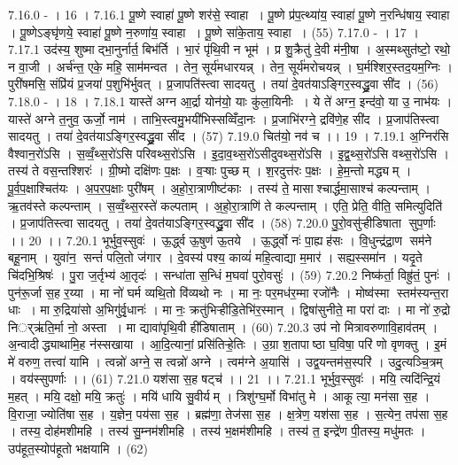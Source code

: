 7.16.0
- । 16 ।
7.16.1
पू॒ष्णे स्वाहा॑ पू॒ष्णे शर॑से॒ स्वाहा । पू॒ष्णे प्र॑प॒त्थ्या॑य॒ स्वाहा॑ पू॒ष्णे न॒रन्धि॑षाय॒ स्वाहा । पू॒ष्णेऽङ्घृ॑णये॒ स्वाहा॑ पू॒ष्णे न॒रुणा॑य॒ स्वाहा । पू॒ष्णे सा॑के॒ताय॒ स्वाहा । (55)
7.17.0
- । 17 ।
7.17.1
उद॑स्य॒ शुष्माद्भा॒नुर्नार्त॒ बिभ॑र्ति । भा॒रं पृ॑थि॒वी न भूम॑ । प्र शु॒क्रैतु॑ दे॒वी म॑नी॒षा । अ॒स्मथ्सुत॑ष्टो॒ रथो॒ न वा॒जी । अर्च॑न्त॒ एके॒ महि॒ साम॑मन्वत । तेन॒ सूर्य॑मधारयन्न् । तेन॒ सूर्य॑मरोचयन्न् । घ॒र्मश्शिर॒स्तद॒यम॒ग्निः । पुरी॑षमसि॒ संप्रि॑यं प्र॒जया॑ प॒शुभि॑र्भुवत् । प्र॒जापति॑स्त्वा सादयतु । तया॑ दे॒वत॑याऽङ्गिर॒स्वद्ध्रु॒वा सी॑द । (56)
7.18.0
- । 18 ।
7.18.1
यास्ते॑ अग्न आ॒र्द्रा योन॑यो॒ याः कु॑ला॒यिनीः । ये ते॑ अग्न॒ इन्द॑वो॒ या उ॒ नाभ॑यः । यास्ते॑ अग्ने त॒नुव॒ ऊर्जो॒ नाम॑ । ताभि॒स्त्वमु॒भयी॑भिस्सव्विँदा॒नः । प्र॒जाभि॑रग्ने॒ द्रवि॑णे॒ह सी॑द । प्र॒जाप॑तिस्त्वा सादयतु । तया॑ दे॒वत॑याऽङ्गिर॒स्वद्ध्रु॒वा सी॑द । (57)
7.19.0
चित॑यो॒ नव॑ च ।। 19 ।
7.19.1
अ॒ग्निर॑सि वैश्वान॒रो॑ऽसि । स॒व्वँ॒थ्स॒रो॑ऽसि परिवथ्स॒रो॑ऽसि । इ॒दा॒व॒थ्स॒रो॑ऽसीदुवथ्स॒रो॑ऽसि । इ॒द्व॒थ्स॒रो॑ऽसि वथ्स॒रो॑ऽसि । तस्य॑ ते वस॒न्तश्शिरः॑ । ग्री॒ष्मो दक्षि॑णः प॒क्षः । व॒ऱ्षाः पुच्छम् । श॒रदुत्त॑रः प॒क्षः । हे॒म॒न्तो मद्ध्यम् । पू॒र्व॒प॒क्षाश्चित॑यः । अ॒प॒र॒प॒क्षाः पुरी॑षम् । अ॒हो॒रा॒त्राणीष्ट॑काः । तस्य॑ ते॒ मासाश्चार्द्धमा॒साश्च॑ कल्पन्ताम् । ऋ॒तव॑स्ते कल्पन्ताम् । स॒व्वँ॒थ्स॒रस्ते॑ कल्पताम् । अ॒हो॒रा॒त्राणि॑ ते कल्पन्ताम् । एति॒ प्रेति॒ वीति॒ समित्युदिति॑ । प्र॒जाप॑तिस्त्वा सादयतु । तया॑ दे॒वत॑याऽङ्गिर॒स्वद्ध्रु॒वा सी॑द । (58)
7.20.0
पु॒रो॒वसु॑ऱ्हीडिषाता सुप॒र्णाः ।। 20 ।।
7.20.1
भूर्भुव॒स्सुवः॑ । ऊ॒र्द्ध्व ऊ॒षुण॑ ऊ॒तये । ऊ॒र्द्ध्वो नः॑ पा॒ह्यह॑सः । वि॒धुन्द्र॑द्रा॒ण सम॑ने बहू॒नाम् । युवा॑न॒॒ सन्तं॑ पलि॒तो ज॑गार । दे॒वस्य॑ पश्य॒ काव्यं॑ महि॒त्वाद्या म॒मार॑ । सह्य॒स्समा॑न । यदृ॒ते चि॑दभि॒श्रिषः॑ । पु॒रा ज॒र्तृभ्य॑ आ॒तृदः॑ । सन्धा॑ता स॒न्धिं म॒घवा॑ पुरो॒वसुः॑ । (59)
7.20.2
निष्क॑र्ता॒ विह्रु॑तं॒ पुनः॑ । पुन॑रू॒र्जा स॒ह र॒य्या । मा नो॑ घर्म व्यथि॒तो वि॑व्यथो नः । मा नः॒ पर॒मध॑र॒म्मा रजो॑नैः । मोष्व॑स्मा स्तम॑स्यन्त॒रा धाः । मा रु॒द्रिया॑सो अ॒भिगु॑र्वृ॒धानः॑ । मा नः॒ क्रतु॑भिऱ्हीडि॒तेभि॑र॒स्मान् । द्विषा॑सुनीते॒ मा परा॑ दाः । मा नो॑ रु॒द्रो निर््ऋ॑ति॒र्मा नो॒ अस्ता । मा द्यावा॑पृथि॒वी ही॑डिषाताम् । (60)
7.20.3
उप॑ नो मित्रावरुणावि॒हाव॑तम् । अ॒न्वादीद्ध्याथामि॒ह न॑स्सखाया । आ॒दि॒त्यानां॒ प्रसि॑तिऱ्हे॒तिः । उ॒ग्रा श॒तापाष्ठा घ॒विषा॒ परि॑ णो वृणक्तु । इ॒मं मे॑ वरुण॒ तत्त्वा॑ यामि । त्वन्नो॑ अग्ने॒ स त्वन्नो॑ अग्ने । त्वम॑ग्ने अ॒यासि॑ । उद्व॒यन्तम॑स॒स्परि॑ । उदु॒त्यञ्चि॒त्रम् । वय॑स्सुपर्णाः ।। (61)
7.21.0
यश॑सा स॒ह षट्च॑ ।। 21 ।।
7.21.1
भूर्भुव॒स्सुवः॑ । मयि॒ त्यदि॑न्द्रि॒यं म॒हत् । मयि॒ दक्षो॒ मयि॒ क्रतुः॑ । मयि॑ धायि सु॒वीर्यम् । त्रिशु॑ग्घ॒र्मो विभा॑तु मे । आकूत्या॒ मन॑सा स॒ह । वि॒राजा॒ ज्योति॑षा स॒ह । य॒ज्ञेन॒ पय॑सा स॒ह । ब्रह्म॑णा॒ तेज॑सा स॒ह । क्ष॒त्रेण॒ यश॑सा स॒ह । स॒त्येन॒ तप॑सा स॒ह । तस्य॒ दोह॑मशीमहि । तस्य॑ सु॒म्नम॑शीमहि । तस्य॑ भ॒क्षम॑शीमहि । तस्य॑ त॒ इन्द्रे॑ण पी॒तस्य॒ मधु॑मतः । उप॑हूत॒स्योप॑हूतो भक्षयामि । (62)
